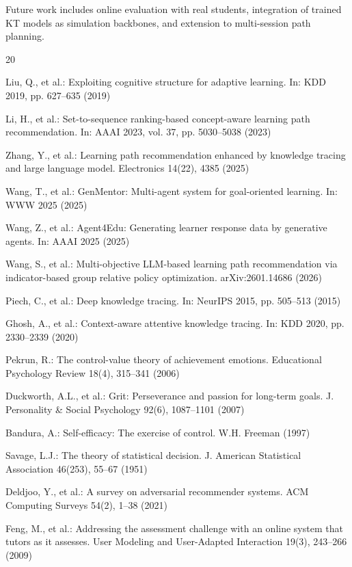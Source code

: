 \documentclass[runningheads]{llncs}
\begin{document}
Future work includes online evaluation with real students, integration of trained KT models as simulation backbones, and extension to multi-session path planning.


\begin{thebibliography}{20}

Liu, Q., et al.: Exploiting cognitive structure for adaptive learning. In: KDD 2019, pp. 627--635 (2019)

Li, H., et al.: Set-to-sequence ranking-based concept-aware learning path recommendation. In: AAAI 2023, vol. 37, pp. 5030--5038 (2023)

Zhang, Y., et al.: Learning path recommendation enhanced by knowledge tracing and large language model. Electronics 14(22), 4385 (2025)

Wang, T., et al.: GenMentor: Multi-agent system for goal-oriented learning. In: WWW 2025 (2025)

Wang, Z., et al.: Agent4Edu: Generating learner response data by generative agents. In: AAAI 2025 (2025)

Wang, S., et al.: Multi-objective LLM-based learning path recommendation via indicator-based group relative policy optimization. arXiv:2601.14686 (2026)

Piech, C., et al.: Deep knowledge tracing. In: NeurIPS 2015, pp. 505--513 (2015)

Ghosh, A., et al.: Context-aware attentive knowledge tracing. In: KDD 2020, pp. 2330--2339 (2020)

Pekrun, R.: The control-value theory of achievement emotions. Educational Psychology Review 18(4), 315--341 (2006)

Duckworth, A.L., et al.: Grit: Perseverance and passion for long-term goals. J. Personality \& Social Psychology 92(6), 1087--1101 (2007)

Bandura, A.: Self-efficacy: The exercise of control. W.H. Freeman (1997)

Savage, L.J.: The theory of statistical decision. J. American Statistical Association 46(253), 55--67 (1951)

Deldjoo, Y., et al.: A survey on adversarial recommender systems. ACM Computing Surveys 54(2), 1--38 (2021)

Feng, M., et al.: Addressing the assessment challenge with an online system that tutors as it assesses. User Modeling and User-Adapted Interaction 19(3), 243--266 (2009)

\end{thebibliography}
\end{document}
